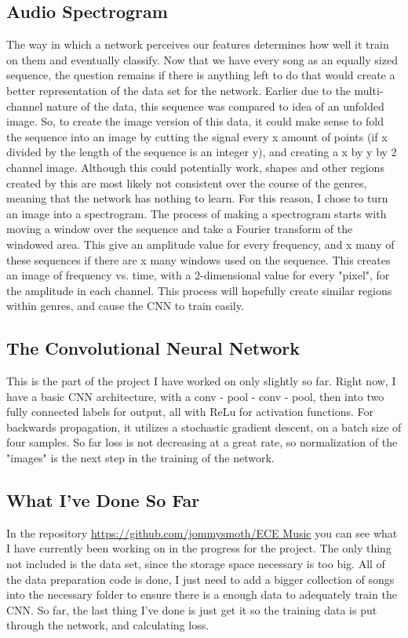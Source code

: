 \documentclass{article}
\begin{document}
\subsection{Audio Spectrogram}
The way in which a network perceives our features determines how well it train on them and eventually classify. Now that we have every song as an equally sized sequence, the question remains if there is anything left to do that would create a better representation of the data set for the network. Earlier due to the multi-channel nature of the data, this sequence was compared to idea of an unfolded image. So, to create the image version of this data, it could make sense to fold the sequence into an image by cutting the signal every x amount of points (if x divided by the length of the sequence is an integer y), and creating a x by y by 2 channel image. Although this could potentially work, shapes and other regions created by this are most likely not consistent over the course of the genres, meaning that the network has nothing to learn. For this reason, I chose to turn an image into a spectrogram. The process of making a spectrogram starts with moving a window over the sequence and take a Fourier transform of the windowed area. This give an amplitude value for every frequency, and x many of these sequences if there are x many windows used on the sequence. This creates an image of frequency vs. time, with a 2-dimensional value for every "pixel", for the amplitude in each channel. This process will hopefully create similar regions within genres, and cause the CNN to train easily.
\subsection{The Convolutional Neural Network}
This is the part of the project I have worked on only slightly so far. Right now, I have a basic CNN architecture, with a conv - pool - conv - pool, then into two fully connected labels for output, all with ReLu for activation functions. For backwards propagation, it utilizes a stochastic gradient descent, on a batch size of four samples. So far loss is not decreasing at a great rate, so normalization of the "images" is the next step in the training of the network. 
\subsection{What I've Done So Far}
In the repository \href{https://github.com/jommysmoth/ECE_Music}{https://github.com/jommysmoth/ECE Music} you can see what I have currently been working on in the progress for the project. The only thing not included is the data set, since the storage space necessary is too big. All of the data preparation code is done, I just need to add a bigger collection of songs into the necessary folder to ensure there is a enough data to adequately train the CNN. So far, the last thing I've done is just get it so the training data is put through the network, and calculating loss.
\end{document}
